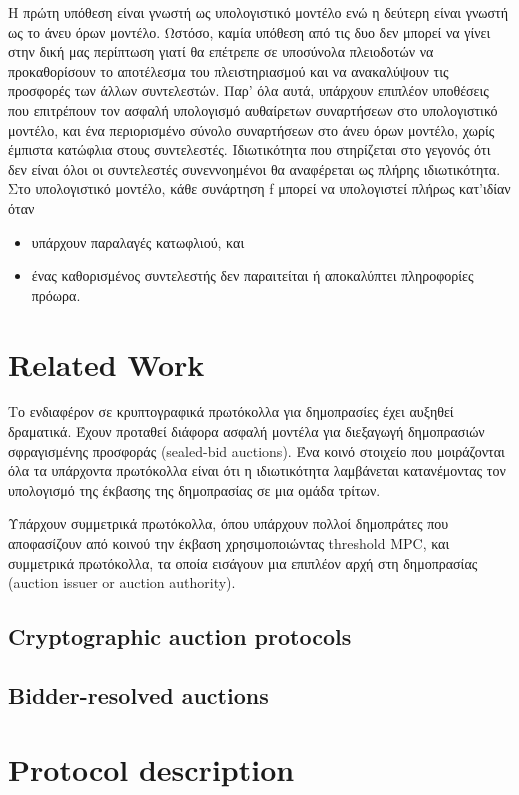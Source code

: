 \documentclass[a4paper,11pt]{article}
\begin{document}
Η πρώτη υπόθεση είναι γνωστή ως υπολογιστικό μοντέλο ενώ η δεύτερη είναι γνωστή ως το άνευ όρων μοντέλο.
Ωστόσο, καμία υπόθεση από τις δυο δεν μπορεί να γίνει στην δική μας περίπτωση γιατί θα επέτρεπε σε υποσύνολα
πλειοδοτών να προκαθορίσουν το αποτέλεσμα του πλειστηριασμού και να ανακαλύψουν τις προσφορές των άλλων
συντελεστών. Παρ' όλα αυτά, υπάρχουν επιπλέον υποθέσεις που επιτρέπουν τον ασφαλή υπολογισμό αυθαίρετων
συναρτήσεων στο υπολογιστικό μοντέλο, και ένα περιορισμένο σύνολο συναρτήσεων στο άνευ όρων μοντέλο, χωρίς
έμπιστα κατώφλια στους συντελεστές. Ιδιωτικότητα που στηρίζεται στο γεγονός ότι δεν είναι όλοι οι συντελεστές
συνεννοημένοι θα αναφέρεται ως πλήρης ιδιωτικότητα. Στο υπολογιστικό μοντέλο, κάθε συνάρτηση f μπορεί να
υπολογιστεί πλήρως κατ'ιδίαν όταν 
\begin{itemize}
	\item υπάρχουν παραλαγές κατωφλιού, και 
	\item ένας καθορισμένος συντελεστής δεν παραιτείται ή αποκαλύπτει πληροφορίες πρόωρα.
\end{itemize}

\section{Related Work}

Το ενδιαφέρον σε κρυπτογραφικά πρωτόκολλα για δημοπρασίες έχει αυξηθεί δραματικά. Έχουν προταθεί διάφορα
ασφαλή μοντέλα για διεξαγωγή δημοπρασιών σφραγισμένης προσφοράς (sealed-bid auctions). Ένα κοινό στοιχείο που
μοιράζονται όλα τα υπάρχοντα πρωτόκολλα είναι ότι η ιδιωτικότητα λαμβάνεται κατανέμοντας τον υπολογισμό της
έκβασης της δημοπρασίας σε μια ομάδα τρίτων.

Υπάρχουν συμμετρικά πρωτόκολλα, όπου υπάρχουν πολλοί δημοπράτες που αποφασίζουν από κοινού την έκβαση
χρησιμοποιώντας threshold MPC, και συμμετρικά πρωτόκολλα, τα οποία εισάγουν μια επιπλέον αρχή στη δημοπρασίας
(auction issuer or auction authority).

	\subsection{Cryptographic auction protocols}
	\subsection{Bidder-resolved auctions}
	
\section{Protocol description}
\end{document}
